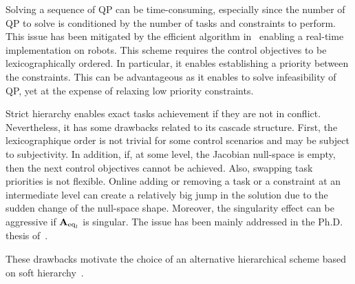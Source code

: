 Solving a sequence of QP can be time-consuming, especially since the number of QP to solve is conditioned by the number of tasks and constraints to perform. This issue has been mitigated by the efficient algorithm in~\cite{escande2014ijrr} enabling a real-time implementation on robots. This scheme requires the control objectives to be lexicographically ordered. In particular, it enables establishing a priority between the constraints. This can be advantageous as it enables to solve infeasibility of QP, yet at the expense of relaxing low priority constraints. 

Strict hierarchy enables exact tasks achievement if they are not in conflict. Nevertheless,  it has some drawbacks related to its cascade structure. First, the lexicographique order is not trivial for some control scenarios and may be subject to subjectivity. In addition, if, at some level,  the Jacobian null-space is empty, then the next control objectives cannot be achieved. Also, swapping task priorities is not flexible. Online adding or removing a task or a constraint at an intermediate level can create a relatively big jump in the solution due to the sudden change of the null-space shape. Moreover, the singularity effect can be aggressive if $\mathbf{A}_{{\rm eq}_l}$ is singular. The issue has been mainly addressed in the Ph.D. thesis of~\cite{pfeiffer2019phdThesis}. 

These drawbacks motivate the choice of an alternative hierarchical scheme based on soft hierarchy~\cite{dehio2015iros}.   

